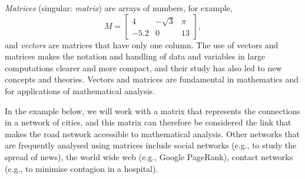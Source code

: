 \emph{Matrices} (singular: \emph{matrix}) are arrays of numbers, for example,
\[ M = \begin{bmatrix}
 4 & -\sqrt{3} & \pi \\ -5.2 & 0 & 13
\end{bmatrix}, \]
and \emph{vectors} are matrices that have only one column. The use of vectors and matrices makes the notation and handling of data and variables in large computations clearer and more compact, and their study has also led to new concepts and theories. Vectors and matrices are fundamental in mathematics and for applications of mathematical analysis.

In the example below, we will work with a matrix that represents the connections in a network of cities, and this matrix can therefore be considered the link that makes the road network accessible to mathematical analysis. Other networks that are frequently analysed using matrices include social networks (e.g., to study the spread of news), the world wide web (e.g., Google PageRank), contact networks (e.g., to minimise contagion in a hospital).

